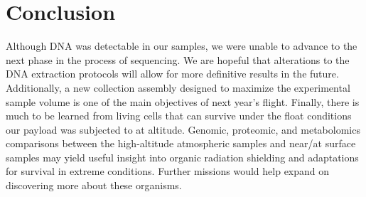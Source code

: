 \section{Conclusion}
\label{sec:Conclusion}
%
%
Although DNA was detectable in our samples, we were unable to advance to the next phase in the process of sequencing. We are hopeful that alterations to the DNA extraction protocols will allow for more definitive results in the future. Additionally, a new collection assembly designed to maximize the experimental sample volume is one of the main objectives of next year’s flight. Finally, there is much to be learned from living cells that can survive under the ﬂoat conditions our payload was subjected to at altitude. Genomic, proteomic, and metabolomics comparisons between the high-altitude atmospheric samples and near/at surface samples may yield useful insight into organic radiation shielding and adaptations for survival in extreme conditions. Further missions would help expand on discovering more about these organisms. 
%
